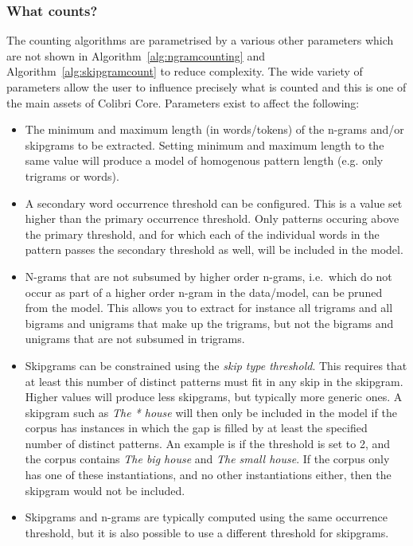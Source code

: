 \documentclass[a4paper,12pt]{article}
\begin{document}
\subsubsection{What counts?}
\label{sec:whatcounts}

The counting algorithms are parametrised by a various other parameters which
are not shown in Algorithm~\ref{alg:ngramcounting} and
Algorithm~\ref{alg:skipgramcount} to reduce complexity. The wide variety of
parameters allow the user to influence precisely what is counted and this is one
of the main assets of Colibri Core. Parameters exist to affect the following:

\begin{itemize}
    \item The minimum and maximum length (in words/tokens) of the n-grams
        and/or skipgrams to be extracted. Setting minimum and maximum length to
        the same value will produce a model of homogenous pattern length (e.g.
        only trigrams or words).
    \item A secondary word occurrence threshold can be configured. This is a value set higher than
        the primary occurrence threshold. Only patterns
        occuring above the primary threshold, and for which each of the
        individual words in the pattern passes the secondary threshold as well, will
        be included in the model.
    \item N-grams that are not subsumed by higher order n-grams, i.e.\ which do
        not  occur as part of a higher order n-gram in the data/model, can be pruned
        from the model. This allows you to extract for instance all trigrams
        and all bigrams and unigrams that make up the trigrams, but not the
        bigrams and unigrams that are not subsumed in trigrams. 
    \item Skipgrams can be constrained using the \emph{skip type threshold}. This
        requires that at least this number of distinct patterns must fit in any 
        skip in the skipgram. Higher values will produce less skipgrams, but
        typically more generic ones. A skipgram such as \emph{The * house} will
        then only be included in the model if the corpus has instances in which the gap is
        filled by at least the specified number of distinct patterns. 
        An example is if the threshold is set to 2, and the corpus contains \emph{The
        big house} and \emph{The small house}. If the corpus  only has
        one of these instantiations, and no other instantiations either, then the skipgram would not be included.
    \item Skipgrams and n-grams are typically computed using the same
        occurrence threshold, but it is also possible to use a different threshold
        for skipgrams.
\end{itemize}
\end{document}
